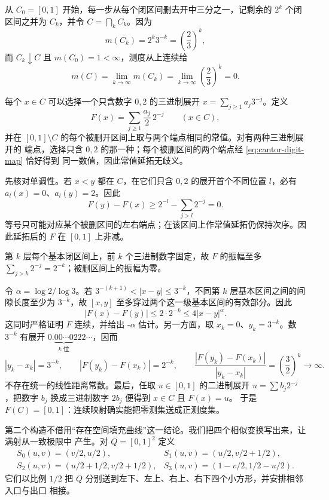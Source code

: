 \begin{example}\label{ex:2-4-3-1}
从 $C_0=[0,1]$ 开始，每一步从每个闭区间删去开中三分之一，记剩余的 $2^k$ 个闭区间之并为
$C_k$，并令 $C=\bigcap_kC_k$。因为
\[
 m(C_k)=2^k3^{-k}=\left(\frac23\right)^k,
\]
而 $C_k\downarrow C$ 且 $m(C_0)=1<\infty$，测度从上连续给
\[
 m(C)=\lim_{k\to\infty}m(C_k)
 =\lim_{k\to\infty}\left(\frac23\right)^k=0.
\]

每个 $x\in C$ 可以选择一个只含数字 $0,2$ 的三进制展开
$x=\sum_{j\ge1}a_j3^{-j}$。定义
\[
 F(x)=\sum_{j\ge1}\frac{a_j}{2}\,2^{-j}\qquad(x\in C),
 \tag{2.4.16}\label{eq:cantor-digit-map}
\]
并在 $[0,1]\setminus C$ 的每个被删开区间上取与两个端点相同的常值。对有两种三进制展开的
端点，选择只含 $0,2$ 的那一种；每个被删区间的两个端点经 \eqref{eq:cantor-digit-map} 恰好得到
同一数值，因此常值延拓无歧义。

先核对单调性。若 $x<y$ 都在 $C$，在它们只含 $0,2$ 的展开首个不同位置 $l$，必有
$a_l(x)=0$、$a_l(y)=2$。因此
\[
 F(y)-F(x)
 \ge2^{-l}-\sum_{j>l}2^{-j}=0.
\]
等号只可能对应某个被删区间的左右端点；在该区间上作常值延拓仍保持次序。因此延拓后的 $F$ 在
$[0,1]$ 上非减。

第 $k$ 层每个基本闭区间上，前 $k$ 个三进制数字固定，故 $F$ 的振幅至多
$\sum_{j>k}2^{-j}=2^{-k}$；被删区间上的振幅为零。

令 $\alpha=\log2/\log3$。若
$3^{-(k+1)}<|x-y|\le3^{-k}$，不同第 $k$ 层基本区间之间的间隙长度至少为 $3^{-k}$，故
$[x,y]$ 至多穿过两个这一级基本区间的有效部分。因此
\[
 |F(x)-F(y)|\le2\cdot2^{-k}\le4|x-y|^\alpha.
\]
这同时严格证明 $F$ 连续，并给出 \Holder{}-$\alpha$ 估计。另一方面，取
$x_k=0$、$y_k=3^{-k}$。数 $3^{-k}$ 有展开
$0.\underbrace{00\cdots0}_{k\text{ 位}}222\cdots$，因而
\[
 |y_k-x_k|=3^{-k},\qquad
 |F(y_k)-F(x_k)|=2^{-k},\qquad
 \frac{|F(y_k)-F(x_k)|}{|y_k-x_k|}=\left(\frac32\right)^k\to\infty.
\]
不存在统一的线性距离常数。最后，任取 $u\in[0,1]$ 的二进制展开
$u=\sum b_j2^{-j}$，把数字 $b_j$ 换成三进制数字 $2b_j$ 便得到 $x\in C$ 且 $F(x)=u$。
于是 $F(C)=[0,1]$：连续映射确实能把零测集送成正测度集。
\end{example}

第二个构造不借用“存在空间填充曲线”这一结论。我们把四个相似变换写出来，让满射从一致极限中
产生。对 $Q=[0,1]^2$ 定义
\[
 \begin{array}{ll}
 S_0(u,v)=(v/2,u/2),
 &S_1(u,v)=(u/2,v/2+1/2),\\[2mm]
 S_2(u,v)=(u/2+1/2,v/2+1/2),
 &S_3(u,v)=(1-v/2,1/2-u/2).
 \end{array}
 \tag{2.4.17}\label{eq:hilbert-similarities}
\]
它们以比例 $1/2$ 把 $Q$ 分别送到左下、左上、右上、右下四个小方形，并安排相邻入口与出口
相接。

